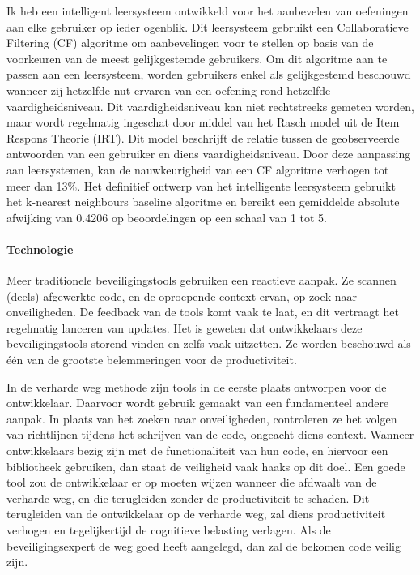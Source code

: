 Ik heb een intelligent leersysteem ontwikkeld voor het aanbevelen van oefeningen aan elke gebruiker op ieder ogenblik.
Dit leersysteem gebruikt een Collaboratieve Filtering (CF) algoritme om aanbevelingen voor te stellen op basis van de voorkeuren van de meest gelijkgestemde gebruikers.
Om dit algoritme aan te passen aan een leersysteem, worden gebruikers enkel als gelijkgestemd beschouwd wanneer zij hetzelfde nut ervaren van een oefening rond hetzelfde vaardigheidsniveau.
Dit vaardigheidsniveau kan niet rechtstreeks gemeten worden, maar wordt regelmatig ingeschat door middel van het Rasch model uit de Item Respons Theorie (IRT).
Dit model beschrijft de relatie tussen de geobserveerde antwoorden van een gebruiker en diens vaardigheidsniveau.
Door deze aanpassing aan leersystemen, kan de nauwkeurigheid van een CF algoritme verhogen tot meer dan 13\%.
Het definitief ontwerp van het intelligente leersysteem gebruikt het k-nearest neighbours baseline algoritme en bereikt een gemiddelde absolute afwijking van 0.4206 op beoordelingen op een schaal van 1 tot 5.

\paragraph{Technologie}
Meer traditionele beveiligingstools gebruiken een reactieve aanpak. Ze scannen (deels) afgewerkte code, en de oproepende context ervan, op zoek naar onveiligheden.
De feedback van de tools komt vaak te laat, en dit vertraagt het regelmatig lanceren van updates.
Het is geweten dat ontwikkelaars deze beveiligingstools storend vinden en zelfs vaak uitzetten.
Ze worden beschouwd als één van de grootste belemmeringen voor de productiviteit.

In de verharde weg methode zijn tools in de eerste plaats ontworpen voor de ontwikkelaar.
Daarvoor wordt gebruik gemaakt van een fundamenteel andere aanpak.
In plaats van het zoeken naar onveiligheden, controleren ze het volgen van richtlijnen tijdens het schrijven van de code, ongeacht diens context.
Wanneer ontwikkelaars bezig zijn met de functionaliteit van hun code, en hiervoor een bibliotheek gebruiken, dan staat de veiligheid vaak haaks op dit doel.
Een goede tool zou de ontwikkelaar er op moeten wijzen wanneer die afdwaalt van de verharde weg, en die terugleiden zonder de productiviteit te schaden.
Dit terugleiden van de ontwikkelaar op de verharde weg, zal diens productiviteit verhogen en tegelijkertijd de cognitieve belasting verlagen.
Als de beveiligingsexpert de weg goed heeft aangelegd, dan zal de bekomen code veilig zijn.

